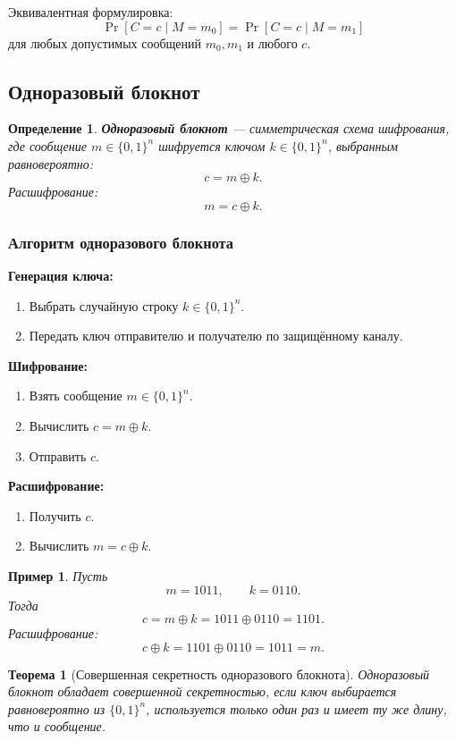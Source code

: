 \documentclass[12pt,a4paper]{article}
\newtheorem{definition}{Определение}
\newtheorem{theorem}{Теорема}
\newtheorem{example}{Пример}
\begin{document}
Эквивалентная формулировка:
\[
    \Pr[C=c \mid M=m_0] = \Pr[C=c \mid M=m_1]
\]
для любых допустимых сообщений $m_0,m_1$ и любого $c$.

\subsection{Одноразовый блокнот}

\begin{definition}
\textbf{Одноразовый блокнот} --- симметрическая схема шифрования, где сообщение $m \in \{0,1\}^n$ шифруется ключом $k \in \{0,1\}^n$, выбранным равновероятно:
\[
    c = m \oplus k.
\]
Расшифрование:
\[
    m = c \oplus k.
\]
\end{definition}

\subsubsection*{Алгоритм одноразового блокнота}

\textbf{Генерация ключа:}
\begin{enumerate}
    \item Выбрать случайную строку $k \in \{0,1\}^n$.
    \item Передать ключ отправителю и получателю по защищённому каналу.
\end{enumerate}

\textbf{Шифрование:}
\begin{enumerate}
    \item Взять сообщение $m \in \{0,1\}^n$.
    \item Вычислить $c=m\oplus k$.
    \item Отправить $c$.
\end{enumerate}

\textbf{Расшифрование:}
\begin{enumerate}
    \item Получить $c$.
    \item Вычислить $m=c\oplus k$.
\end{enumerate}

\begin{example}
Пусть
\[
    m=1011,\qquad k=0110.
\]
Тогда
\[
    c=m\oplus k=1011\oplus 0110=1101.
\]
Расшифрование:
\[
    c\oplus k=1101\oplus 0110=1011=m.
\]
\end{example}

\begin{theorem}[Совершенная секретность одноразового блокнота]
Одноразовый блокнот обладает совершенной секретностью, если ключ выбирается равновероятно из $\{0,1\}^n$, используется только один раз и имеет ту же длину, что и сообщение.
\end{theorem}
\end{document}
